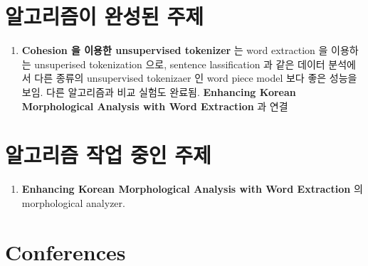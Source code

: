 \documentclass[11pt]{article}
\begin{document}
\section{알고리즘이 완성된 주제}

\begin{enumerate}
    \item \textbf{Cohesion 을 이용한 unsupervised tokenizer} 는 word extraction 을 이용하는 unsuperised tokenization 으로, sentence lassification 과 같은 데이터 분석에서 다른 종류의 unsupervised tokenizaer 인 word piece model 보다 좋은 성능을 보임. 다른 알고리즘과 비교 실험도 완료됨. \textbf{Enhancing Korean Morphological Analysis with Word Extraction} 과 연결
    
\end{enumerate}

\section{알고리즘 작업 중인 주제}

\begin{enumerate}
    \item \textbf{Enhancing Korean Morphological Analysis with Word Extraction} 의 morphological analyzer.
\end{enumerate}

\section*{Conferences}
\end{document}

